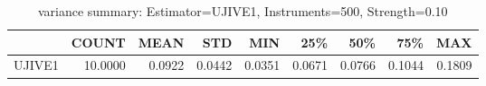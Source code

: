 \begin{table}[ht]
\centering
\caption{variance summary: Estimator=UJIVE1, Instruments=500, Strength=0.10}
\begin{tabular}{lrrrrrrrr}
\toprule
 & COUNT & MEAN & STD & MIN & 25\% & 50\% & 75\% & MAX \\
\midrule
UJIVE1 & 10.0000 & 0.0922 & 0.0442 & 0.0351 & 0.0671 & 0.0766 & 0.1044 & 0.1809 \\
\bottomrule
\end{tabular}
\end{table}
